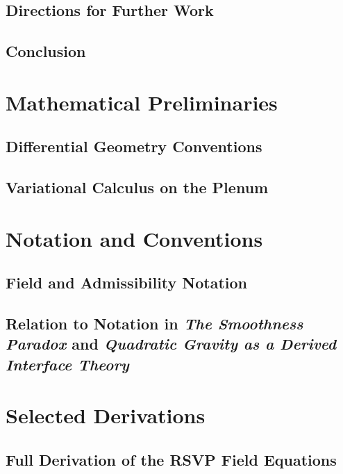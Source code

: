\documentclass[12pt,a4paper,twoside,openright]{book}
\theoremstyle{plain}
\theoremstyle{definition}
\theoremstyle{remark}
\begin{document}
\section{Directions for Further Work}

\section{Conclusion}


\backmatter

\chapter{Mathematical Preliminaries}
\label{app:math}

\section{Differential Geometry Conventions}

\section{Variational Calculus on the Plenum}


\chapter{Notation and Conventions}
\label{app:notation}

\section{Field and Admissibility Notation}

\section{Relation to Notation in \emph{The Smoothness Paradox} and \emph{Quadratic Gravity as a Derived Interface Theory}}


\chapter{Selected Derivations}
\label{app:derivations}

\section{Full Derivation of the RSVP Field Equations}
\end{document}
